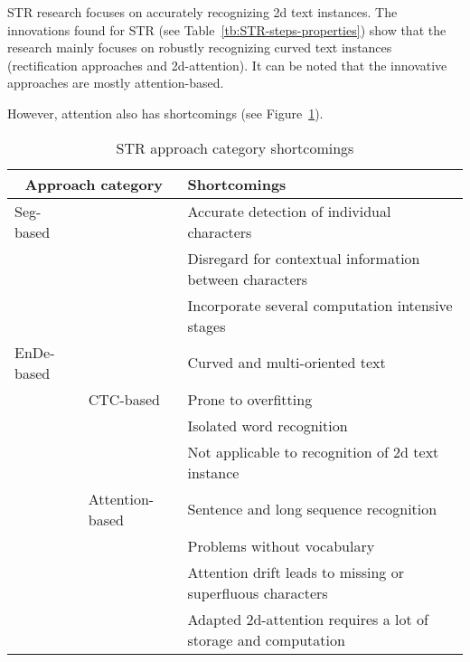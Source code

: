 \ac{STR} research focuses on accurately recognizing 2d text instances.
The innovations found for \ac{STR} (see Table~\ref{tb:STR-steps-properties}) show that the research
mainly focuses on robustly recognizing curved text instances (rectification approaches and
2d-attention).
It can be noted that the innovative approaches are mostly attention-based.

However, attention also has shortcomings (see Figure~\ref{tb:STR-shortcomings}).
\begin{table}[h]
    \centering\scriptsize
    \begin{tabular}{p{}p{}p{}}
        \multicolumn{2}{c}{\textbf{Approach category}} & \textbf{Shortcomings} \\
        \toprule
        Seg-based & & Accurate detection of individual
                        characters~\citep{chen_text_2021,cheng_aon_2018} \\
        & & Disregard for contextual information between characters~\citep{chen_text_2021} \\
        & & Incorporate several computation intensive stages~\citep{liu_abcnet_2020} \\
        \midrule
        \ac{EnDe}-based & & Curved and multi-oriented text~\citep{cheng_aon_2018, long_scene_2021} \\
        & CTC-based & Prone to overfitting~\citep{chen_text_2021} \\
        & & Isolated word recognition~\citep{cong_comparative_2019} \\
        & & Not applicable to recognition of 2d text instance~\citep{cheng_focusing_2017,
            xie_aggregation_2019,chen_text_2021} \\
        & Attention-based & Sentence and long sequence
            recognition~\citep{cong_comparative_2019,chen_text_2021} \\
        & & Problems without vocabulary~\citep{wan_vocabulary_2020} \\
        & & Attention drift leads to missing or superfluous
            characters~\citep{liao_scene_2018,xie_aggregation_2019,chen_text_2021}\\
        & & Adapted 2d-attention requires a lot of storage and
            computation~\citep{xie_aggregation_2019,chen_text_2021} \\
        \bottomrule
    \end{tabular}
    \caption{STR approach category shortcomings\label{tb:STR-shortcomings}}
\end{table}
